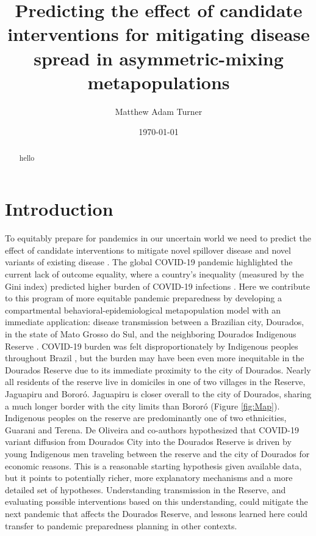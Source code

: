 \documentclass[
  letterpaper,
  abstract]{scrartcl}
\title{Predicting the effect of candidate interventions for mitigating
disease spread in asymmetric-mixing metapopulations}
\author{Matthew Adam Turner}
\date{\today}
\renewcommand*\contentsname{Table of contents}
\newcommand\contentsname{Table of contents}
\begin{document}
\maketitle
\begin{abstract}
\noindent hello
\end{abstract}

\renewcommand*\contentsname{Table of contents}
{
\hypersetup{linkcolor=}
\setcounter{tocdepth}{3}
\tableofcontents
}
\section{Introduction}\label{introduction}

To equitably prepare for pandemics in our uncertain world we
need to predict the effect of candidate interventions to mitigate novel spillover
disease and novel variants of existing disease
\autocite{Rodo2021,Adashi2022}. The global COVID-19 pandemic highlighted
the current lack of outcome equality, where a country's inequality
(measured by the Gini index) predicted higher burden of COVID-19
infections \autocite{Su2022}. Here we contribute to this program of more
equitable pandemic preparedness by developing a compartmental
behavioral-epidemiological metapopulation model with an immediate application:
disease transmission between a Brazilian city, Dourados, in the state of 
Mato Grosso do Sul, and the
neighboring Dourados Indigenous Reserve \autocite{DeOliveira2023}.
COVID-19 burden was felt disproportionately by Indigenous peoples throughout
Brazil \autocite{Simionatto2020}, but the burden may have been even more 
inequitable in the
Dourados Reserve due to its immediate proximity to the city of Dourados. Nearly
all residents of the reserve live in domiciles in one of two villages in
the Reserve, Jaguapiru and Bororó. Jaguapiru is closer overall to the
city of Dourados, sharing a much longer border with the city limits than
Bororó (Figure \ref{fig:Map}). Indigenous peoples on the reserve are predominantly
one of two ethnicities, Guarani and Terena. 
De Oliveira and co-authors hypothesized that COVID-19 variant diffusion
from Dourados City into the Dourados Reserve is driven by young
Indigenous men traveling between the reserve and the city of Dourados
for economic reasons. This is a reasonable starting hypothesis given available
data, but it points to potentially richer, more explanatory mechanisms and 
a more detailed set of hypotheses. Understanding transmission in the Reserve, and
evaluating possible interventions based on this understanding, could mitigate
the next pandemic that affects the Dourados Reserve, and lessons learned here could
transfer to pandemic preparedness planning in other contexts.
\end{document}
